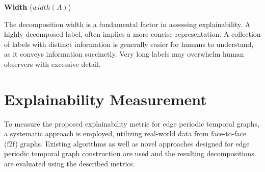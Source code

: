 \textbf{Width} ($width(A)$)

The decomposition width is a fundamental factor in assessing explainability. A highly decomposed label, often implies a more concise representation. A collection of labels with distinct information is generally easier for humans to understand, as it conveys information succinctly. Very long labels may overwhelm human observers with excessive detail.


\section{Explainability Measurement}

To measure the proposed explainability metric for edge periodic temporal graphs, a systematic approach is employed, utilizing real-world data from face-to-face (f2f) graphs. Existing algorithms as well as novel approaches designed for edge periodic temporal graph construction are used and the resulting decompositions are evaluated using the described metrics.